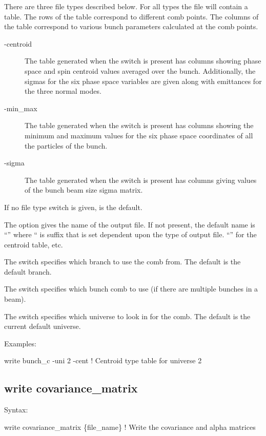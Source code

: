 {{{{{{{{{{{There are three file types described below. For all types the file will contain a table. The rows of
the table correspond to different comb points. The columns of the table correspond to various bunch
parameters calculated at the comb points.
\begin{description}
\item[-centroid] \Newline
The table generated when the  switch is present has columns showing phase space and
spin centroid values averaged over the bunch. Additionally, the sigmas for the six phase space
variables are given along with emittances for the three normal modes.
%
\item[-min_max] \Newline
The table generated when the  switch is present has columns showing the minimum and
maximum values for the six phase space coordinates of all the particles of the bunch.
% 
\item[-sigma] \Newline 
The table generated when the  switch is present has columns giving values of the bunch
beam size sigma matrix.
\end{description}
If no file type switch is given,  is the default.

The  option gives the name of the output file. If not present, the default name is
``'' where `` is suffix that is set dependent upon the type of output
file. ``'' for the centroid table, etc.

The  switch specifies which branch to use the comb from. The default is the default
branch.

The  switch specifies which bunch comb to use (if there are multiple bunches in a beam).

The  switch specifies which universe to look in for the comb. The default is the
current default universe.

Examples:
\begin{example}
  write bunch_c -uni 2 -cent  ! Centroid type table for universe 2
\end{example}


\subsection{write covariance_matrix}
\label{s:write.covar.matrix}

Syntax:
\begin{example}
    write covariance_matrix \{file_name\}    ! Write the covariance and alpha matrices 
\end{example}

}}}}}}}}}}}
